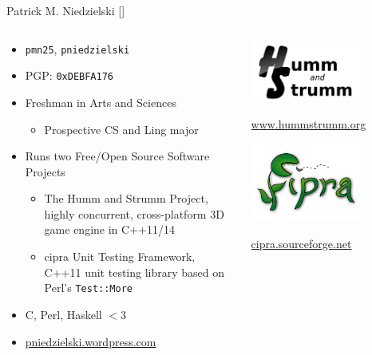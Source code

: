 \documentclass{beamer}
\def\cpp{C\raisebox{0.5ex}{\tiny\textbf{++}}}
\begin{document}
\begin{frame}{Patrick M. Niedzielski
    []}
  \begin{columns}
    \begin{column}{0.65\textwidth}
      \begin{itemize}
      \item \texttt{pmn25}, \texttt{pniedzielski}
      \item PGP: \texttt{0xDEBFA176}
      \item Freshman in Arts and Sciences
        \begin{itemize}
        \item Prospective CS and Ling major
        \end{itemize}
      \item Runs two Free/Open Source Software Projects
        \begin{itemize}
          \item The Humm and Strumm Project, highly concurrent,
            cross-platform 3D game engine in C++11/14
          \item cipra Unit Testing Framework, C++11 unit testing
            library based on Perl's \texttt{Test::More}
          \end{itemize}
      \item\cpp, Perl, Haskell $<$3
      \item\small{\url{pniedzielski.wordpress.com}}
      \end{itemize}
    \end{column}
    \begin{column}{0.35\textwidth}
      \centerline{\includegraphics[width=0.7\textwidth]{hummstrumm.png}}
      \centerline{\small{\url{www.hummstrumm.org}}}
      \centerline{\includegraphics[width=0.7\textwidth]{cipra.png}}
      \centerline{\small{\url{cipra.sourceforge.net}}}
    \end{column}
  \end{columns}
\end{frame}
\end{document}
